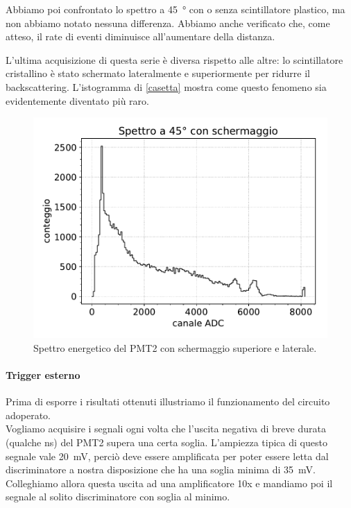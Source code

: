Abbiamo poi confrontato lo spettro a \SI{45}{\degree} con o senza scintillatore plastico, ma non abbiamo notato nessuna differenza. Abbiamo anche verificato che, come atteso, il rate di eventi diminuisce all'aumentare della distanza.

L'ultima acquisizione di questa serie è diversa rispetto alle altre: lo scintillatore cristallino è stato schermato lateralmente e superiormente per ridurre il backscattering. L'istogramma di \autoref{casetta} mostra come questo fenomeno sia evidentemente diventato più raro.

\begin{figure}
\centering
\includegraphics[width=25 em]{45gs}
\caption{Spettro energetico del PMT2 con schermaggio superiore e laterale.}
\label{casetta}
\end{figure}

\paragraph{Trigger esterno} Prima di esporre i risultati ottenuti illustriamo il funzionamento del circuito adoperato.\\
Vogliamo acquisire i segnali ogni volta che l'uscita negativa di breve durata (qualche \si{ns}) del PMT2 supera una certa soglia. L'ampiezza tipica di questo segnale vale \SI{20}{mV}, perciò deve essere amplificata per poter essere letta dal discriminatore a nostra disposizione che ha una soglia minima di \SI{35}{mV}. Colleghiamo allora questa uscita ad una amplificatore 10x 
e mandiamo poi il segnale al solito discriminatore con soglia al minimo.

